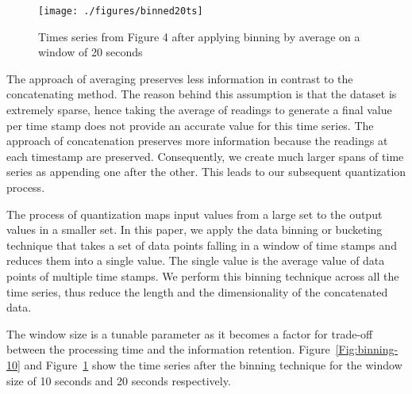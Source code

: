 \begin{figure}
	\texttt{[image: ./figures/binned20ts]}
	\caption{Times series from Figure 4 after applying binning by average on a window of 20 seconds}
	\label{Fig:binning-20}
\end{figure}


The approach of averaging preserves less information in contrast to the concatenating method. The reason behind this assumption is that the dataset is extremely sparse, hence taking the average of readings to generate a final value per time stamp does not provide an accurate value for this time series. The approach of concatenation preserves more information because the readings at each timestamp are preserved. Consequently, we create much larger spans of time series as appending one after the other. This leads to our subsequent quantization process. 

The process of quantization maps input values from a large set to the output values in a smaller set. In this paper, we apply the data binning or bucketing technique that takes a set of data points falling in a window of time stamps and reduces them into a single value. The single value is the average value of data points of multiple time stamps.  We perform this binning technique across all the time series, thus reduce the length and the dimensionality of the concatenated data.  

The window size is a tunable parameter as it becomes a factor for trade-off between the processing time and the information retention. Figure~\ref{Fig:binning-10} and Figure~\ref{Fig:binning-20} show the time series after the binning technique for the window size of 10 seconds and 20 seconds respectively. 
